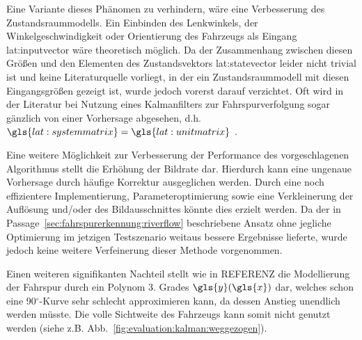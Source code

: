Eine Variante dieses Phänomen zu verhindern, wäre eine Verbesserung des Zustandsraummodells. 
Ein Einbinden des Lenkwinkels, der Winkelgeschwindigkeit oder Orientierung des Fahrzeugs als Eingang \gls{lat:inputvector} wäre theoretisch möglich. Da der Zusammenhang zwischen diesen Größen und den Elementen des Zustandsvektors \gls{lat:statevector} leider nicht trivial ist und keine Literaturquelle vorliegt, in der ein Zustandsraummodell mit diesen Eingangsgrößen gezeigt ist, wurde jedoch vorerst darauf verzichtet. Oft wird in der Literatur bei Nutzung eines Kalmanfilters zur Fahrspurverfolgung sogar gänzlich von einer Vorhersage abgesehen, d.h. \(\gls{lat:systemmatrix}=\gls{lat:unitmatrix}\) \autocite{limRiverFlowLane2012}.

Eine weitere Möglichkeit zur Verbesserung der Performance des vorgeschlagenen Algorithmus stellt die Erhöhung der Bildrate dar. Hierdurch kann eine ungenaue Vorhersage durch häufige Korrektur ausgeglichen werden. Durch eine noch effizientere Implementierung, Parameteroptimierung sowie eine Verkleinerung der Auflösung und/oder des Bildausschnittes könnte dies erzielt werden. Da der in Passage~\ref{sec:fahrspurerkennung:riverflow} beschriebene Ansatz ohne jegliche Optimierung im jetzigen Testszenario weitaus bessere Ergebnisse lieferte, wurde jedoch keine weitere Verfeinerung dieser Methode vorgenommen.

Einen weiteren signifikanten Nachteil stellt wie in REFERENZ die Modellierung der Fahrspur durch ein Polynom 3. Grades \(\gls{y}(\gls{x})\) dar, welches schon eine 90\(^\circ\)-Kurve sehr schlecht approximieren kann, da dessen Anstieg unendlich werden müsste. Die volle Sichtweite des Fahrzeugs kann somit nicht genutzt werden (siehe z.B. Abb.~\ref{fig:evaluation:kalman:weggezogen}).
